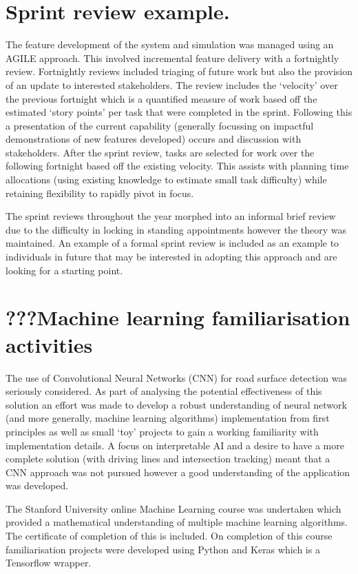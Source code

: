 \documentclass{article}
\begin{document}
\section{Sprint review example.}

The feature development of the system and simulation was managed using an AGILE approach. This involved incremental feature delivery with a fortnightly review. Fortnightly reviews included triaging of future work but also the provision of an update to interested stakeholders. The review includes the `velocity' over the previous fortnight which is a quantified measure of work based off the estimated `story points' per task that were completed in the sprint. Following this a presentation of the current capability (generally focussing on impactful demonstrations of new features developed) occurs and discussion with stakeholders. After the sprint review, tasks are selected for work over the following fortnight based off the existing velocity. This assists with planning time allocations (using existing knowledge to estimate small task difficulty) while retaining flexibility to rapidly pivot in focus.

The sprint reviews throughout the year morphed into an informal brief review due to the difficulty in locking in standing appointments however the theory was maintained. An example of a formal sprint review is included as an example to individuals in future that may be interested in adopting this approach and are looking for a starting point.

\section{???Machine learning familiarisation activities}

The use of Convolutional Neural Networks (CNN) for road surface detection was seriously considered. As part of analysing the potential effectiveness of this solution an effort was made to develop a robust understanding of neural network (and more generally, machine learning algorithms) implementation from first principles as well as small `toy' projects to gain a working familiarity with implementation details. A focus on interpretable AI and a desire to have a more complete solution (with driving lines and intersection tracking) meant that a CNN approach was not pursued however a good understanding of the application was developed.

The Stanford University online Machine Learning course was undertaken which provided a mathematical understanding of multiple machine learning algorithms. The certificate of completion of this is included. On completion of this course familiarisation projects were developed using Python and Keras which is a Tensorflow wrapper. 
\end{document}
